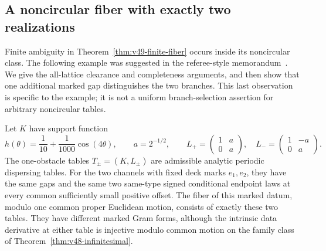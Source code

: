 \subsection{A noncircular fiber with exactly two realizations}
\label{subsec:v50-two-branch}

Finite ambiguity in Theorem~\ref{thm:v49-finite-fiber} occurs inside
its noncircular class.  The following example was suggested in the
referee-style memorandum~\cite{A2ReviewV49}.  We give the all-lattice
clearance and completeness arguments, and then show that one additional
marked gap distinguishes the two branches.  This last observation is
specific to the example; it is not a uniform branch-selection assertion
for arbitrary noncircular tables.

\begin{proposition}
\label{prop:v50-two-table}
Let $K$ have support function
\begin{equation}\label{eq:v50-support}
 h(\theta)=\frac1{10}+\frac1{1000}\cos(4\theta),
 \qquad a=2^{-1/2},\qquad
 L_+=\begin{pmatrix}1&a\\0&a\end{pmatrix},\quad
 L_-=\begin{pmatrix}1&-a\\0&a\end{pmatrix}.
\end{equation}
The one-obstacle tables $T_\pm=(K,L_\pm)$ are admissible analytic
periodic dispersing tables.  For the two channels with fixed deck marks
$e_1,e_2$, they have the same gaps and the same two same-type signed
conditional endpoint laws at every common sufficiently small positive
offset.  The fiber of this marked datum, modulo one common proper
Euclidean motion, consists of exactly these two tables.  They have
different marked Gram forms, although the intrinsic data derivative
at either table is injective modulo common motion on the family class
of Theorem~\ref{thm:v48-infinitesimal}.
\end{proposition}
